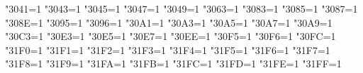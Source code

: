 %
\def\parseargusing#1#2{%
  \def\argtorun{#2}%
  \begingroup
    \ifx\ltjlineendcomment\thisisundefined
      \catcode"FFFFF=9
    \else
      \catcode\ltjlineendcomment=9
    \fi
    \obeylines
    \spaceisspace
    #1%
    \parseargline\empty%
}
\def\comment{\begingroup \catcode`\^^M=\active%
  \ifx\ltjlineendcomment\thisisundefined
    \catcode"FFFFF=9%
  \else
    \catcode\ltjlineendcomment=9%
  \fi
\catcode`\@=\other \catcode`\{=\other \catcode`\}=\other\commentxxx}%
\let\setfilename=\comment
\let\dircategory=\comment
\let\definfoenclose=\comment
\let\footnotestyle=\comment
\def\c{\begingroup \catcode`\^^M=\active%
  \ifx\ltjlineendcomment\thisisundefined
    \catcode"FFFFF=9%
  \else
    \catcode\ltjlineendcomment=9%
  \fi
\catcode`\@=\other \catcode`\{=\other \catcode`\}=\other%
\cxxx}
\let\texinfoc=\c
\fi %

%
\ifx\XeTeXrevision\thisisundefined
\else
\def\do#1{\XeTeXcharclass"#1=1 }
\do{3041}\do{3043}\do{3045}\do{3047}\do{3049}\do{3063}
\do{3083}\do{3085}\do{3087}\do{308E}\do{3095}\do{3096}
\do{30A1}\do{30A3}\do{30A5}\do{30A7}\do{30A9}\do{30C3}
\do{30E3}\do{30E5}\do{30E7}\do{30EE}\do{30F5}\do{30F6}
\do{30FC}\do{31F0}\do{31F1}\do{31F2}\do{31F3}\do{31F4}
\do{31F5}\do{31F6}\do{31F7}\do{31F8}\do{31F9}\do{31FA}
\do{31FB}\do{31FC}\do{31FD}\do{31FE}\do{31FF}

\def\setjafont#1{%
  \let\zhfont#1\let\zhpunctfont#1%
  \let\zhextafont#1\let\zhextbfont#1%
}

